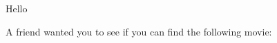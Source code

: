 \documentclass{article}
\begin{document}
Hello %

A friend wanted you to see if you can find the following movie:
\end{document}
